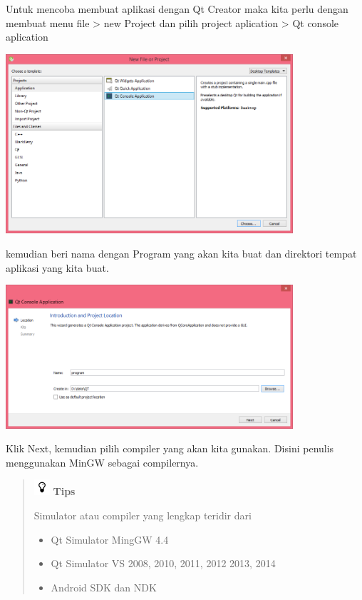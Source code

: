   Untuk mencoba membuat aplikasi dengan Qt Creator maka kita perlu
  dengan membuat menu file \textgreater{} new Project dan pilih project
  aplication \textgreater{} Qt console aplication

  \begin{center}

  \includegraphics[width=0.8\textwidth]{../manuscript/images/qt-console-aplication.PNG}

  \end{center}

  kemudian beri nama dengan Program yang akan kita buat dan direktori
  tempat aplikasi yang kita buat.

  \begin{center}

  \includegraphics[width=0.8\textwidth]{../manuscript/images/qt-console-aplication-2.PNG}

  \end{center}

  Klik Next, kemudian pilih compiler yang akan kita gunakan. Disini
  penulis menggunakan MinGW sebagai compilernya.


\begin{quotation}
\includegraphics{../manuscript/images/tips.png}	\textbf{Tips}
	
	Simulator 	 atau compiler yang lengkap teridir dari
	
	\begin{itemize}
		
		\item
		Qt Simulator MingGW 4.4
		\item
		Qt Simulator VS 2008, 2010, 2011, 2012 2013, 2014
		\item
		Android SDK dan NDK
	\end{itemize}
\end{quotation}




